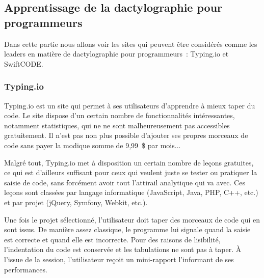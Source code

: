 \documentclass[a4paper,12pt]{article}
\begin{document}
\subsection{Apprentissage de la dactylographie pour programmeurs}

Dans cette partie nous allons voir les sites qui peuvent être considérés comme les leaders en matière de dactylographie pour programmeurs~: Typing.io et SwiftCODE.

\subsubsection{Typing.io}

Typing.io est un site qui permet à ses utilisateurs d'apprendre à mieux taper du code. Le site dispose d'un certain nombre de fonctionnalités intéressantes, notamment statistiques, qui ne ne sont malheureusement pas accessibles gratuitement. Il n'est pas non plus possible d'ajouter ses propres morceaux de code sans payer la modique somme de 9,99~\$ par mois...

Malgré tout, Typing.io met à disposition un certain nombre de leçons gratuites, ce qui est d'ailleurs suffisant pour ceux qui veulent juste se tester ou pratiquer la saisie de code, sans forcément avoir tout l'attirail analytique qui va avec. Ces leçons sont classées par langage informatique (JavaScript, Java, PHP, C++, etc.) et par projet (jQuery, Symfony, Webkit, etc.).

Une fois le projet sélectionné, l'utilisateur doit taper des morceaux de code qui en sont issus. De manière assez classique, le programme lui signale quand la saisie est correcte et quand elle est incorrecte. Pour des raisons de lisibilité, l'indentation du code est conservée et les tabulations ne sont pas à taper. À l'issue de la session, l'utilisateur reçoit un mini-rapport l'informant de ses performances.
\end{document}
